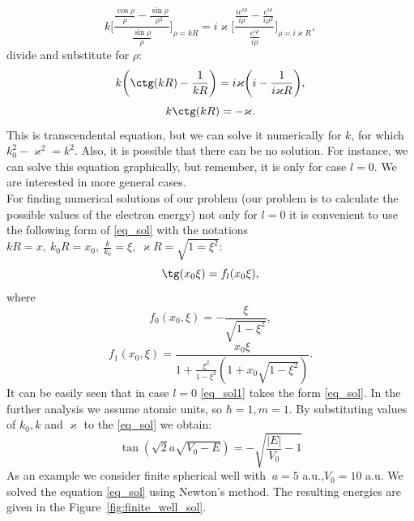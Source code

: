 \documentclass[a4paper, 12pt]{article}
\begin{document}
$$k \bigg[ \frac{\frac{\cos \rho}{\rho} - \frac{\sin \rho}{\rho^2}}{\frac{\sin \rho}{\rho}} \bigg]_{\rho = kR} = i \varkappa \bigg[ \frac{\frac{i e^{i \rho}}{i \rho} - \frac{e^{i \rho}}{i \rho^2}}{\frac{e^{i \rho}}{i \rho}} \bigg]_{\rho = i \varkappa R},
$$
divide and substitute for  $\rho$:
$$k \bigg(\ctg(kR)-\frac{1}{kR}\bigg) = i \varkappa \bigg( i - \frac{1}{i \varkappa R} \bigg),$$
\begin{equation}\label{eq_sol}
	k \ctg(kR) = - \varkappa.
\end{equation}
This is transcendental equation, but we can solve it numerically for  $k$,  for which $k_0^2-\varkappa^2=k^2.$ Also, it is possible that there can be no solution. For instance, we can solve this equation graphically, but remember, it is only for case $l=0.$ We are interested in more general cases.\\
For finding numerical solutions of our problem (our problem is to calculate the possible values of the electron energy) not only for $l=0$ it is convenient to use the following form of \eqref{eq_sol} with the notations $kR = x, ~k_0 R=x_0, ~\frac{k}{k_0} = \xi, ~\varkappa R = \sqrt{1=\xi^2}$:
\begin{equation}\label{eq_sol1}
	\tg(x_0 \xi) = f_l(x_0 \xi),
\end{equation}
where
$$f_0(x_0, \xi) = -\frac{\xi}{\sqrt{1-\xi^2}},$$
$$f_1(x_0, \xi) = \frac{x_0 \xi}{1+\frac{\xi^2}{1-\xi^2}(1+x_0 \sqrt{1-\xi^2})}.$$ 
It can be easily seen that in case $l=0$ \eqref{eq_sol1} takes the form \eqref{eq_sol}. In the further analysis we assume atomic units, so $\hbar = 1, m=1.$ By substituting values of $k_0, k$ and $\varkappa$ to the \eqref{eq_sol} we obtain:
$$\tan(\sqrt{2} a \sqrt{V_0-E})=-\sqrt{\frac{|E|}{V_0}-1}$$ 
As an example we consider finite spherical well with $\ a = 5 $ a.u.,$ V_0 = 10$ a.u. We solved the equation \eqref{eq_sol} using Newton's method. The resulting energies are given in the Figure~\ref{fig:finite_well_sol}.
\end{document}
